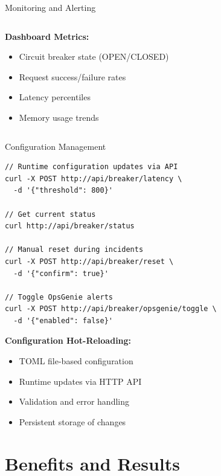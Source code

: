 \documentclass[aspectratio=169]{beamer}
\begin{document}
\begin{frame}{Monitoring and Alerting}
\begin{columns}
\begin{column}{0.5\textwidth}
            \vspace{0.3cm}
            \textbf{Dashboard Metrics:}
            \begin{itemize}
                \item Circuit breaker state (OPEN/CLOSED)
                \item Request success/failure rates
                \item Latency percentiles
                \item Memory usage trends
            \end{itemize}
        \end{column}
    \end{columns}
\end{frame}

\begin{frame}[fragile]{Configuration Management}
\begin{lstlisting}[style=gostyle]
// Runtime configuration updates via API
curl -X POST http://api/breaker/latency \
  -d '{"threshold": 800}'

// Get current status
curl http://api/breaker/status

// Manual reset during incidents
curl -X POST http://api/breaker/reset \
  -d '{"confirm": true}'

// Toggle OpsGenie alerts
curl -X POST http://api/breaker/opsgenie/toggle \
  -d '{"enabled": false}'
\end{lstlisting}

\textbf{Configuration Hot-Reloading:}
\begin{itemize}
    \item TOML file-based configuration
    \item Runtime updates via HTTP API
    \item Validation and error handling
    \item Persistent storage of changes
\end{itemize}
\end{frame}

\section{Benefits and Results}
\end{document}
